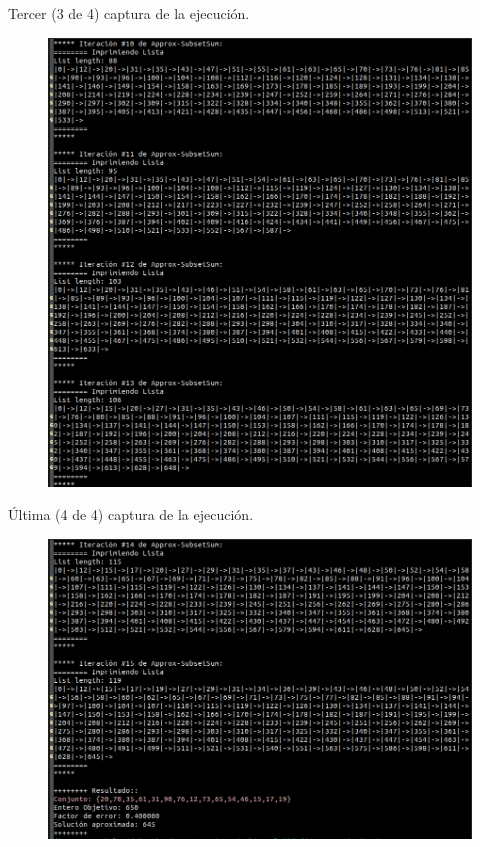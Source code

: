\documentclass[14pt,letterpaper]{article}
\begin{document}
  \clearpage
  Tercer (3 de 4) captura de la ejecución.
  \begin{figure}[h]
    \includegraphics[width=15cm]{sample4_3.png}
    \centering
  \end{figure}
  \clearpage
  Última (4 de 4) captura de la ejecución.
  \begin{figure}[h]
    \includegraphics[width=15cm]{sample4_4.png}
    \centering
  \end{figure}
  \clearpage
\end{document}
